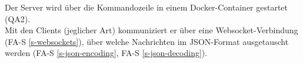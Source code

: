 Der Server wird über die Kommandozeile in einem Docker-Container gestartet (QA2).\\
Mit den Clients (jeglicher Art) kommuniziert er über eine Websocket-Verbindung (FA-S \ref{s-websockets}), über welche Nachrichten im JSON-Format ausgetauscht werden (FA-S \ref{s-json-encoding}, FA-S \ref{s-json-decoding}).